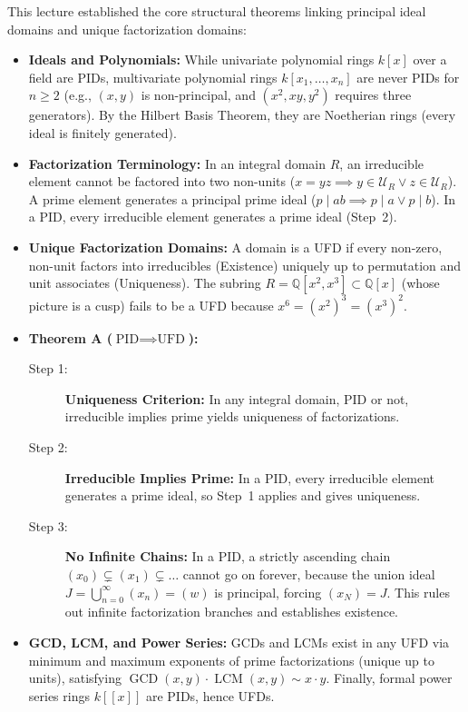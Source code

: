 \begin{overview}
This lecture established the core structural theorems linking principal ideal domains and unique factorization domains:
\begin{itemize}
    \item \textbf{Ideals and Polynomials:} While univariate polynomial rings $k[x]$ over a field are PIDs, multivariate polynomial rings $k[x_1, \dots, x_n]$ are never PIDs for $n \ge 2$ (e.g., $(x, y)$ is non-principal, and $(x^2, xy, y^2)$ requires three generators). By the Hilbert Basis Theorem, they are Noetherian rings (every ideal is finitely generated).
    \item \textbf{Factorization Terminology:} In an integral domain $R$, an irreducible element cannot be factored into two non-units ($x = yz \implies y \in \mathcal{U}_R \lor z \in \mathcal{U}_R$). A prime element generates a principal prime ideal ($p \mid ab \implies p \mid a \lor p \mid b$). In a PID, every irreducible element generates a prime ideal (Step~2).
    \item \textbf{Unique Factorization Domains:} A domain is a UFD if every non-zero, non-unit factors into irreducibles (Existence) uniquely up to permutation and unit associates (Uniqueness). The subring $R = \mathbb{Q}[x^2, x^3] \subset \mathbb{Q}[x]$ (whose picture is a cusp) fails to be a UFD because $x^6 = (x^2)^3 = (x^3)^2$.
    \item \textbf{Theorem A ($\text{PID} \implies \text{UFD}$):}
    \begin{description}
        \item[Step 1:] \textbf{Uniqueness Criterion:} In any integral domain, PID or not, irreducible implies prime yields uniqueness of factorizations.
        \item[Step 2:] \textbf{Irreducible Implies Prime:} In a PID, every irreducible element generates a prime ideal, so Step~1 applies and gives uniqueness.
        \item[Step 3:] \textbf{No Infinite Chains:} In a PID, a strictly ascending chain $(x_0) \subsetneq (x_1) \subsetneq \dots$ cannot go on forever, because the union ideal $J = \bigcup_{n=0}^\infty (x_n) = (w)$ is principal, forcing $(x_N) = J$. This rules out infinite factorization branches and establishes existence.
    \end{description}
    \item \textbf{GCD, LCM, and Power Series:} GCDs and LCMs exist in any UFD via minimum and maximum exponents of prime factorizations (unique up to units), satisfying $\operatorname{GCD}(x, y) \cdot \operatorname{LCM}(x, y) \sim x \cdot y$. Finally, formal power series rings $k[[x]]$ are PIDs, hence UFDs.
\end{itemize}
\end{overview}